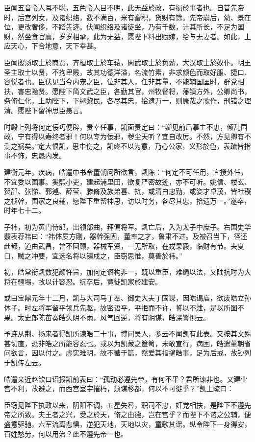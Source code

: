 \documentclass[12pt,UTF8]{ctexbook}
\begin{document}
臣闻五音令人耳不聪，五色令人目不明，此无益於政，有损於事者也。自昔先帝时，后宫列女，及诸织络，数不满百，米有畜积，货财有馀。先帝崩后，幼、景在位，更改奢侈，不蹈先迹。伏闻织络及诸徒坐，乃有千数，计其所长，不足为国财，然坐食官廪，岁岁相承，此为无益，愿陛下料出赋嫁，给与无妻者。如此，上应天心，下合地意，天下幸甚。

臣闻殷汤取士於商贾，齐桓取士於车辕，周武取士於负薪，大汉取士於奴仆。明王圣主取士以贤，不拘卑贱，故其功德洋溢，名流竹素，非求颜色而取好服、捷口、容悦者也。臣伏见当今内宠之臣，位非其人，任非其量，不能辅国匡时，群党相扶，害忠隐贤。愿陛下简文武之臣，各勤其官，州牧督将，藩镇方外，公卿尚书，务脩仁化，上助陛下，下拯黎民，各尽其忠，拾遗万一，则康哉之歌作，刑错之理清。愿陛下留神思臣愚言。

时殿上列将何定佞巧便辟，贵幸任事，凯面责定曰：“卿见前后事主不忠，倾乱国政，宁有得以寿终者邪！何以专为佞邪，秽尘天听？宜自改厉。不然，方见卿有不测之祸矣。”定大恨凯，思中伤之，凯终不以为意，乃心公家，义形於色，表疏皆指事不饰，忠恳内发。

建衡元年，疾病，皓遣中书令董朝问所欲言，凯陈：“何定不可任用，宜授外任，不宜委以国事。奚熙小吏，建起浦里田，欲复严密故迹，亦不可听。姚信、楼玄、贺卲、张悌、郭逴、薛莹、滕脩及族弟喜、抗，或清白忠勤，或姿才卓茂，皆社稷之桢幹，国家之良辅，愿陛下重留神思，访以时务，各尽其忠，拾遗万一。”遂卒，时年七十二。

子祎，初为黄门侍郎，出领部曲，拜偏将军。凯亡后，入为太子中庶子。右国史华覈表荐祎曰：“祎体质方刚，器幹强固，董率之才，鲁肃不过。及被召当下，径还赴都，道由武昌，曾不回顾，器械军资，一无所取，在戎果毅，临财有节。夫夏口，贼之冲要，宜选名将以镇戍之，臣窃思惟，莫善於祎。”

初，皓常衔凯数犯颜忤旨，加何定谮构非一，既以重臣，难绳以法，又陆抗时为大将在疆埸，故以计容忍。抗卒后，竟徙凯家於建安。

或曰宝鼎元年十二月，凯与大司马丁奉、御史大夫丁固谋，因皓谒庙，欲废皓立孙休子。时左将军留平领兵先驱，故密语平，平拒而不许，誓以不泄，是以所图不果。太史郎陈苗奏皓久阴不雨，风气回逆，将有阴谋，皓深警惧云。

予连从荆、扬来者得凯所谏皓二十事，博问吴人，多云不闻凯有此表。又按其文殊甚切直，恐非皓之所能容忍也。或以为凯藏之箧笥，未敢宣行，病困，皓遣董朝省问欲言，因以付之。虚实难明，故不著于篇，然爱其指擿皓事，足为后戒，故钞列于凯传左云。

皓遣亲近赵钦口诏报凯前表曰：“孤动必遵先帝，有何不平？君所谏非也。又建业宫不利，故避之，而西宫室宇摧朽，须谋移都，何以不可徙乎？”凯上疏曰：

臣窃见陛下执政以来，阴阳不调，五星失晷，职司不忠，奸党相扶，是陛下不遵先帝之所致。夫王者之兴，受之於天，脩之由德，岂在宫乎？而陛下不谘之公辅，便盛意驱驰，六军流离悲惧，逆犯天地，天地以灾，童歌其谣。纵令陛下一身得安，百姓愁劳，何以用治？此不遵先帝一也。
\end{document}
